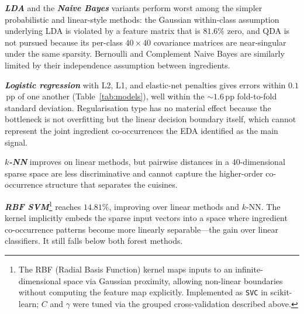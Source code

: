 \documentclass[11pt,a4paper]{article}
\begin{document}
\begin{table}[h]
\centering\small

\caption{Novel-row error: grouped cross-validation ($5\times 3$-fold on singleton rows,
$n\approx507$ per fold) on the raw $40$ features, except the final Extra-Trees row which
also shows the $43$-feature variant. Error is mean misclassification rate; Std is the
fold-to-fold standard deviation. Within each group and across groups: ordered worst to best.}
\label{tab:models}
\end{table}

\textbf{\textit{LDA}} and the \textbf{\textit{Naive Bayes}} variants perform worst among the simpler probabilistic and linear-style methods: the Gaussian
within-class assumption underlying LDA is violated by a feature matrix that is $81.6\%$
zero, and QDA is not pursued because its per-class $40\times40$ covariance matrices are
near-singular under the same sparsity. Bernoulli and Complement Naive Bayes are similarly
limited by their independence assumption between ingredients.

\textbf{\textit{Logistic regression}} with L2, L1, and elastic-net penalties gives errors within $0.1$\,pp
of one another (Table~\ref{tab:models}), well within the $\sim\!1.6$\,pp fold-to-fold
standard deviation. Regularisation type has no material effect because the bottleneck is not
overfitting but the linear decision boundary itself, which cannot represent the joint
ingredient co-occurrences the EDA identified as the main signal.

\textbf{\textit{$k$-NN}} improves on linear methods, but pairwise distances in a $40$-dimensional sparse
space are less discriminative and cannot capture the higher-order co-occurrence structure
that separates the cuisines.

\textbf{\textit{RBF SVM}}\footnote{The RBF (Radial Basis Function) kernel maps inputs to an infinite-dimensional space via
Gaussian proximity, allowing non-linear boundaries without computing the feature map
explicitly. Implemented as \texttt{SVC} in scikit-learn; $C$ and $\gamma$ were tuned
via the grouped cross-validation described above.} reaches $14.81\%$, improving over
linear methods and $k$-NN. The kernel implicitly embeds the sparse input vectors into a
space where ingredient co-occurrence patterns become more linearly separable---the gain
over linear classifiers. It still falls below both forest methods.
\end{document}
